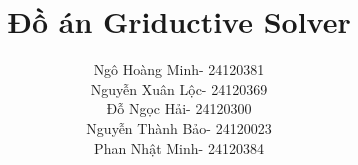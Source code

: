 \documentclass[12pt,a4paper]{article}
\title{Đồ án Griductive Solver}
\author{
    \centering
    \begin{tabular}{ll}
        Ngô Hoàng Minh & - 24120381 \\
        Nguyễn Xuân Lộc & - 24120369 \\
        Đỗ Ngọc Hải & - 24120300 \\
        Nguyễn Thành Bảo & - 24120023 \\
        Phan Nhật Minh & - 24120384 \\
    \end{tabular}
}
\newif\ifisprojectreport
\begin{document}
\ifisprojectreport
    \hypersetup{pageanchor=false}
    \makecoverpage
    \hypersetup{pageanchor=true}
    
    \pagestyle{plain}
    \pagenumbering{roman}
    \tableofcontents
    \newpage
    
    \pagestyle{fancy}
    \pagenumbering{arabic}
\else
    \pagestyle{fancy}
    \makeassignmentheader
\fi









\newpage



\newpage
\appendix

\end{document}
